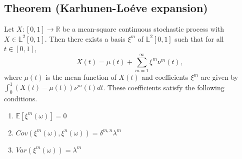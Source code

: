 \documentclass[11pt,twoside,a4paper]{article}
\begin{document}
	
	\subsection{Theorem (Karhunen-Lo\'{e}ve expansion)} \label{Proof2}
	Let $X : [0,1]  \rightarrow \mathbb{R}$ be a mean-square continuous stochastic process with $X \in \mathbb{L}^{2}[0,1]$. Then there exists a basis ${\xi^m}$ of $\mathbb{L}^2[0,1]$ such that for all $t \in [0,1]$,
	\begin{equation}
		X(t) = \mu(t) + \sum_{m=1}^{\infty} \xi^m \nu^m(t),
	\end{equation}
	where $\mu(t)$ is the mean function of $X(t)$ and coefficients $\xi^m$ are given by $\int_{0}^{1} (X(t) - \mu(t)) \nu^m(t)dt$. These coefficients satisfy the following conditions.
	\begin{enumerate}
		\item $\mathbb{E}\left[\xi^m(\omega)\right] = 0$
		\item $Cov\left(\xi^m(\omega), \xi^n(\omega)\right) = \delta^{m,n}\lambda^m$ %
		\item $Var\left(\xi^m(\omega)\right) = \lambda^m$
	\end{enumerate}
\end{document}
